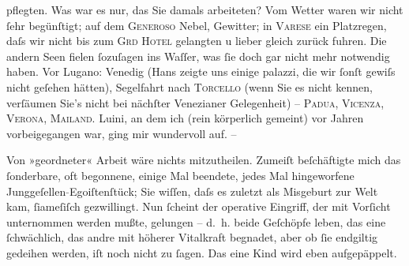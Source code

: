                pflegten. Was war es nur, das Sie damals arbeiteten? Vom Wetter waren wir nicht{ }ſehr
               begünſtigt; auf dem \textsc{Generoso} Nebel, Gewitter; in \textsc{Varese} ein Platzregen, daſs wir nicht \introOben{}bis\introOben{} zum \textsc{Grd Hotel} gelangten u lieber gleich zurück fuhren. Die andern Seen fielen{ }ſozuſagen ins
               Waſſer, was{ }ſie doch gar nicht mehr notwendig haben. Vor Lugano: Venedig (Hans zeigte uns einige {\pb}palazzi, die wir{ }ſonſt gewiſs nicht geſehen hätten),
               Segelfahrt nach \textsc{Torcello} (wenn Sie es nicht kennen, verſäumen Sie’s nicht bei nächſter Venezianer Gelegenheit) – \textsc{Padua}, \textsc{Vicenza}, \textsc{Verona}, \textsc{Mailand}. Luini, an dem ich (rein körperlich
               gemeint) vor Jahren vorbeigegangen war, ging mir wundervoll auf. –\pend
           
\pstart
           Von »geordneter« Arbeit wäre nichts mitzutheilen. Zumeiſt beſchäftigte mich das{ }ſonderbare, {\pb}oft begonnene, einige Mal beendete, jedes
               Mal hingeworfene Junggeſellen\textcolor{gray}{-}Egoiſtenſtück; Sie wiſſen, daſs es
               zuletzt als Misgeburt zur Welt kam,{ }ſiameſiſch gezwillingt. Nun{ }ſcheint der operative
               Eingriff, der mit Vorſicht unternommen werden mußte, gelungen – d. h. beide Geſchöpfe
               leben, das eine{ }ſchwächlich, das andre mit höherer Vitalkraft begnadet, {\pb}aber ob{ }ſie endgiltig gedeihen werden, iſt noch nicht zu{ }ſagen. Das eine Kind wird eben aufgepäppelt.\pend
           
